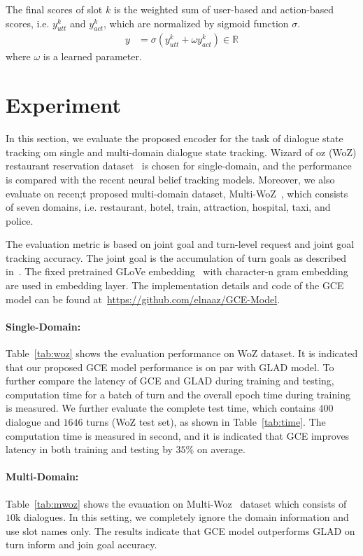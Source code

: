 \documentclass{article}
\begin{document}
The final scores of slot $k$ is the weighted sum of user-based and action-based scores, i.e. $y^{k}_{utt}$ and $y^{k}_{act}$, which are normalized by sigmoid function $\sigma$.
\begin{align}
    y &= \sigma (y^{k}_{utt} + \omega y^{k}_{act}) \in\mathbb{R}
\end{align}
where $\omega$ is a learned parameter. 


\section{Experiment}
In this section, we evaluate the proposed encoder for the task of dialogue state tracking om single and multi-domain dialogue state tracking. Wizard of oz (WoZ) restaurant reservation dataset~\cite{Wen2017ANE} is chosen for single-domain, and the performance is compared with the recent neural belief tracking models. Moreover, we also evaluate on recen;t proposed multi-domain dataset, Multi-WoZ~\citep{Budzianowski2018MultiWOZA}, which consists of seven domains, i.e. restaurant, hotel, train, attraction, hospital, taxi, and police. 

The evaluation metric is based on joint goal and turn-level request and joint goal tracking accuracy. The joint goal is the accumulation of turn goals as described in~\cite{Zhong2018GlobalLocallySD}. The fixed pretrained GLoVe embedding~\citep{pennington2014glove} with character-n gram embedding~\citep{Hashimoto2017AJM} are used in embedding layer. The implementation details and code of the GCE model can be found at~\href{url}{https://github.com/elnaaz/GCE-Model}. 

\paragraph{Single-Domain:} Table~\ref{tab:woz} shows the evaluation performance on WoZ dataset. It is indicated that our proposed GCE model performance is on par with GLAD model. To further compare the latency of GCE and GLAD during training and testing, computation time for a batch of turn and the overall epoch time during training is measured. We further evaluate the complete test time, which contains $400$ dialogue and $1646$ turns (WoZ test set), as shown in Table~\ref{tab:time}. The computation time is measured in second, and it is indicated that GCE improves latency in both training and testing by $35\%$ on average. 

\paragraph{Multi-Domain:} Table~\ref{tab:mwoz} shows the evauation on Multi-Woz~\citep{Budzianowski2018MultiWOZA} dataset which consists of $10$k dialogues. In this setting, we completely ignore the domain information and use slot names only. The results indicate that GCE model outperforms GLAD on turn inform and join goal accuracy.
\end{document}
